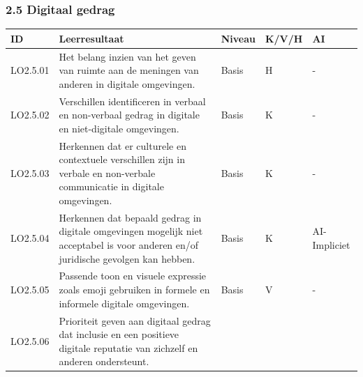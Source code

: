 \documentclass[
  dutch,
  letterpaper,
  DIV=11,
  numbers=noendperiod]{scrartcl}
\begin{document}
\subsubsection{2.5 Digitaal gedrag}\label{digitaal-gedrag}

\begin{longtable}[]{@{}
  >{\centering\arraybackslash}p{}
  >{\centering\arraybackslash}p{}
  >{\centering\arraybackslash}p{}
  >{\centering\arraybackslash}p{}
  >{\centering\arraybackslash}p{}@{}}
\toprule\noalign{}
\begin{minipage}[b]{\linewidth}\centering
ID
\end{minipage} & \begin{minipage}[b]{\linewidth}\centering
Leerresultaat
\end{minipage} & \begin{minipage}[b]{\linewidth}\centering
Niveau
\end{minipage} & \begin{minipage}[b]{\linewidth}\centering
K/V/H
\end{minipage} & \begin{minipage}[b]{\linewidth}\centering
AI
\end{minipage} \\
\midrule\noalign{}
\endhead
\bottomrule\noalign{}
\endlastfoot
LO2.5.01 & Het belang inzien van het geven van ruimte aan de meningen
van anderen in digitale omgevingen. & Basis & H & - \\
LO2.5.02 & Verschillen identificeren in verbaal en non-verbaal gedrag in
digitale en niet-digitale omgevingen. & Basis & K & - \\
LO2.5.03 & Herkennen dat er culturele en contextuele verschillen zijn in
verbale en non-verbale communicatie in digitale omgevingen. & Basis & K
& - \\
LO2.5.04 & Herkennen dat bepaald gedrag in digitale omgevingen mogelijk
niet acceptabel is voor anderen en/of juridische gevolgen kan hebben. &
Basis & K & AI-Impliciet \\
LO2.5.05 & Passende toon en visuele expressie zoals emoji gebruiken in
formele en informele digitale omgevingen. & Basis & V & - \\
LO2.5.06 & Prioriteit geven aan digitaal gedrag dat inclusie en een
positieve digitale reputatie van zichzelf en anderen ondersteunt. &

\end{longtable}
\end{document}
